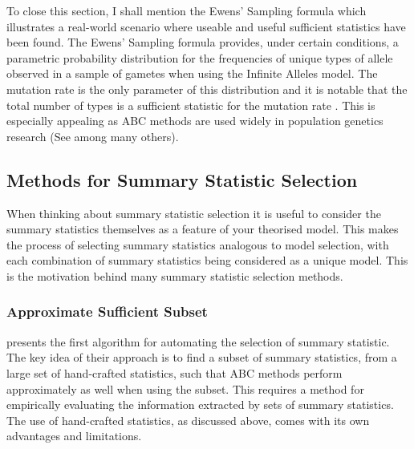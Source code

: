 \documentclass[11pt,a4paper]{article}
\theoremstyle{break}
\begin{document}
  \par To close this section, I shall mention the Ewens' Sampling formula \cite{ewens_sampling_formula} which illustrates a real-world scenario where useable and useful sufficient statistics have been found. The Ewens' Sampling formula provides, under certain conditions, a parametric probability distribution for the frequencies of unique types of allele observed in a sample of gametes when using the Infinite Alleles model. The mutation rate is the only parameter of this distribution and it is notable that the total number of types is a sufficient statistic for the mutation rate \cite[]{partition_structures_and_sufficient_statistics}. This is especially appealing as ABC methods are used widely in population genetics research (See \cite[]{bayesian_inference_of_the_demographic_history_of_chimpanzees,ABC_in_population_genetics,modern_computational_approaches_for_analysing_molecular_genetic_variation_data} among many others).

\subsection{Methods for Summary Statistic Selection}\label{sec_summary_stats_methods}

  \par When thinking about summary statistic selection it is useful to consider the summary statistics themselves as a feature of your theorised model. This makes the process of selecting summary statistics analogous to model selection, with each combination of summary statistics being considered as a unique model. This is the motivation behind many summary statistic selection methods.


\subsubsection{Approximate Sufficient Subset}\label{sec_approximate_sufficient_subset}

  \par \cite[]{Approximately_sufficient_statistics_and_bayesian_computation} presents the first algorithm for automating the selection of summary statistic. The key idea of their approach is to find a subset of summary statistics, from a large set of hand-crafted statistics, such that ABC methods perform approximately as well when using the subset. This requires a method for empirically evaluating the information extracted by sets of summary statistics. The use of hand-crafted statistics, as discussed above, comes with its own advantages and limitations.
\end{document}
